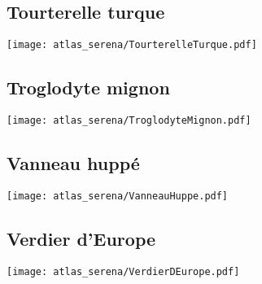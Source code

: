 \subsection{Tourterelle turque}
\texttt{[image: atlas\_serena/TourterelleTurque.pdf]}
\subsection{Troglodyte mignon}
\texttt{[image: atlas\_serena/TroglodyteMignon.pdf]}
\subsection{Vanneau huppé}
\texttt{[image: atlas\_serena/VanneauHuppe.pdf]}
\subsection{Verdier d'Europe}
\texttt{[image: atlas\_serena/VerdierDEurope.pdf]}
